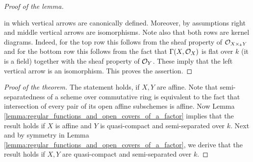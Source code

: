 \begin{proof}[Proof of the lemma]
\begin{center}
\end{center}
in which vertical arrows are canonically defined. Moreover, by assumptions right and middle vertical arrows are isomorphisms. Note also that both rows are kernel diagrams. Indeed, for the top row this follows from the sheaf property of ${\mathcal O}_{X\times_k Y}$ and for the bottom row this follows from the fact that $\Gamma(X,{\mathcal O}_X)$ is flat over $k$ (it is a field) together with the sheaf property of ${\mathcal O}_Y$. These imply that the left vertical arrow is an isomorphism. This proves the assertion.
\end{proof}

\begin{proof}[Proof of the theorem]
The statement holds, if $X,Y$ are affine. Note that semi-separatedness of a scheme over commutative ring is equivalent to the fact that intersection of every pair of its open affine subschemes is affine. Now Lemma \ref{lemma:regular_functions_and_open_covers_of_a_factor} implies that the result holds if $X$ is affine and $Y$ is quasi-compact and semi-separated over $k$. Next and by symmetry in Lemma \ref{lemma:regular_functions_and_open_covers_of_a_factor}, we derive that the result holds if $X,Y$ are quasi-compact and semi-separated over $k$.
\end{proof}

